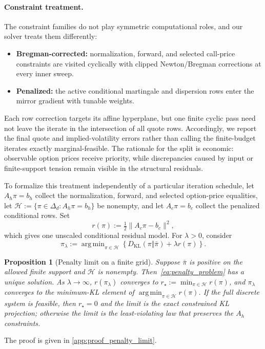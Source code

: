 \documentclass{article}
\newtheorem{proposition}{Proposition}[section]
\newcommand{\argmin}{\operatorname{arg\,min}}
\begin{document}
\paragraph{Constraint treatment.} The constraint families do not play symmetric computational roles, and our solver treats them differently:
\begin{itemize}
    \item \textbf{Bregman-corrected:} normalization, forward, and selected call-price constraints are visited cyclically with clipped Newton/Bregman corrections at every inner sweep.
    \item \textbf{Penalized:} the active conditional martingale and dispersion rows enter the mirror gradient with tunable weights.
\end{itemize}
Each row correction targets its affine hyperplane, but one finite cyclic pass need not leave the iterate in the intersection of all quote rows.
Accordingly, we report the final quote and implied-volatility errors rather than calling the finite-budget iterates exactly marginal-feasible.
The rationale for the split is economic: observable option prices receive priority, while discrepancies caused by input or finite-support tension remain visible in the structural residuals.

To formalize this treatment independently of a particular iteration schedule, let
$A_h\pi=b_h$ collect the normalization, forward, and selected option-price equalities, let
$\mathcal H:=\{\pi\in\Delta_d:A_h\pi=b_h\}$ be nonempty, and let $A_c\pi=b_c$ collect the penalized conditional rows.
Set
\begin{equation}\label{eq:penalty_residual}
r(\pi):=\tfrac12\lVert A_c\pi-b_c\rVert^2,
\end{equation}
which gives one unscaled conditional residual model.
For $\lambda>0$, consider
\begin{equation}\label{eq:penalty_problem}
\pi_\lambda
:=
\argmin_{\pi\in\mathcal H}
\left\{D_{\mathrm{KL}}(\pi\Vert\bar\pi)+\lambda r(\pi)\right\}.
\end{equation}

\begin{proposition}[Penalty limit on a finite grid]\label{prop:penalty_limit}
Suppose $\bar\pi$ is positive on the allowed finite support and $\mathcal H$ is nonempty.
Then~\eqref{eq:penalty_problem} has a unique solution.
As $\lambda\to\infty$, $r(\pi_\lambda)$ converges to
$r_\star:=\min_{\pi\in\mathcal H}r(\pi)$, and $\pi_\lambda$ converges to the minimum-KL element of $\argmin_{\pi\in\mathcal H}r(\pi)$.
If the full discrete system is feasible, then $r_\star=0$ and the limit is the exact constrained KL projection; otherwise the limit is the least-violating law that preserves the $A_h$ constraints.
\end{proposition}
The proof is given in \cref{app:proof_penalty_limit}.
\end{document}

